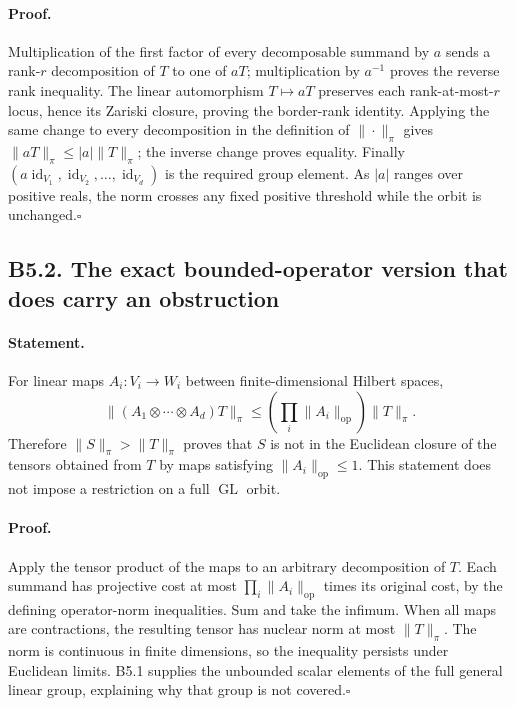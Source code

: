 \paragraph{Proof.}
Multiplication of the first factor of every decomposable summand by
$a$ sends a rank-$r$ decomposition of $T$ to one of $aT$; multiplication
by $a^{-1}$ proves the reverse rank inequality.  The linear
automorphism $T\mapsto aT$ preserves each rank-at-most-$r$ locus, hence
its Zariski closure, proving the border-rank identity.  Applying the
same change to every decomposition in the definition of $\|\cdot\|_\pi$
gives $\|aT\|_\pi\leq|a|\|T\|_\pi$; the inverse change proves
equality.  Finally $(a\operatorname{id}_{V_1},\operatorname{id}_{V_2},
\ldots,\operatorname{id}_{V_d})$ is the required group element.
As $|a|$ ranges over positive reals, the norm crosses any fixed positive
threshold while the orbit is unchanged.\hfill$\square$

\subsection*{B5.2. The exact bounded-operator version that does carry an obstruction}
\paragraph{Statement.}
For linear maps $A_i:V_i\to W_i$ between finite-dimensional Hilbert
spaces,
\[
 \|(A_1\otimes\cdots\otimes A_d)T\|_\pi
 \leq\left(\prod_i\|A_i\|_{\mathrm{op}}\right)\|T\|_\pi.
\]
Therefore $\|S\|_\pi>\|T\|_\pi$ proves that $S$ is not in the
Euclidean closure of the tensors obtained from $T$ by maps satisfying
$\|A_i\|_{\mathrm{op}}\leq1$.  This statement does not impose a
restriction on a full $\operatorname{GL}$ orbit.
\paragraph{Proof.}
Apply the tensor product of the maps to an arbitrary decomposition of
$T$.  Each summand has projective cost at most
$\prod_i\|A_i\|_{\mathrm{op}}$ times its original cost, by the
defining operator-norm inequalities.  Sum and take the infimum.
When all maps are contractions, the resulting tensor has nuclear norm
at most $\|T\|_\pi$.  The norm is continuous in finite dimensions, so
the inequality persists under Euclidean limits.  B5.1 supplies the
unbounded scalar elements of the full general linear group, explaining
why that group is not covered.\hfill$\square$

